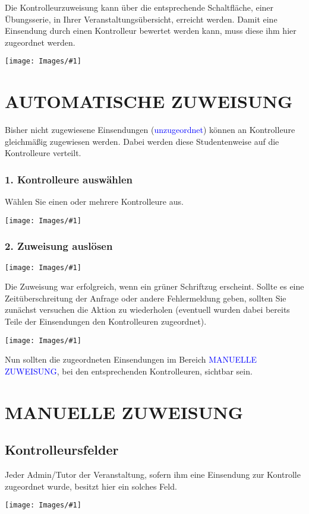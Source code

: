 \documentclass[12pt,a4paper,final]{scrartcl}
\title
{}
\author 
{}
\date{\vspace{12cm}\monthword{\the\month}\space\the\year}
\subtitle
{}
\numberwithin{equation}{section}
\newcommand{\blau}[1]{\textcolor{blue}{#1}}
\newenvironment{Bilder}
  {\par\raggedbottom\null\noindent\minipage{\textwidth}\centering}
  {\endminipage\vspace{0.7cm}}
\newcommand{\tbild}[1]{%
\begin{Bilder}
 \texttt{[image: Images/\#1]}
	\end{Bilder}
}
\begin{document}
Die Kontrolleurzuweisung kann über die entsprechende Schaltfläche, einer Übungsserie, in Ihrer Veranstaltungsübersicht, erreicht werden. Damit eine Einsendung durch einen Kontrolleur bewertet werden kann, muss diese ihm hier zugeordnet werden.
\tbild{pathA}

\pagestyle{seite}
\section{AUTOMATISCHE ZUWEISUNG}
Bisher nicht zugewiesene Einsendungen (\blau{unzugeordnet}) können an Kontrolleure gleichmäßig zugewiesen werden. Dabei werden diese Studentenweise auf die Kontrolleure verteilt.

\subsubsection*{1. Kontrolleure auswählen}
Wählen Sie einen oder mehrere Kontrolleure aus.
\tbild{autoA.png}
\subsubsection*{2. Zuweisung auslösen}
\tbild{autoB.png}
Die Zuweisung war erfolgreich, wenn ein grüner Schriftzug erscheint. Sollte es eine Zeitüberschreitung der Anfrage oder andere Fehlermeldung geben, sollten Sie zunächst versuchen die Aktion zu wiederholen (eventuell wurden dabei bereits Teile der Einsendungen den Kontrolleuren zugeordnet).
\tbild{autoC.png}
Nun sollten die zugeordneten Einsendungen im Bereich \blau{MANUELLE ZUWEISUNG}, bei den entsprechenden Kontrolleuren, sichtbar sein.

\newpage
\section{MANUELLE ZUWEISUNG}
\subsection{Kontrolleursfelder}
Jeder Admin/Tutor der Veranstaltung, sofern ihm eine Einsendung zur Kontrolle zugeordnet wurde, besitzt hier ein solches Feld.
\tbild{manF.png}
\end{document}
